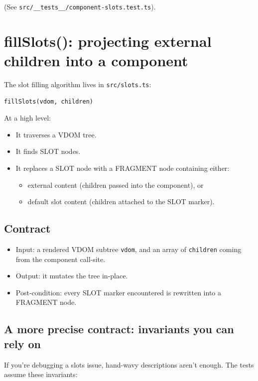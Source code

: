 (See \texttt{src/\_\_tests\_\_/component-slots.test.ts}).

\section{fillSlots(): projecting external children into a component}

The slot filling algorithm lives in \texttt{src/slots.ts}:

\begin{verbatim}
fillSlots(vdom, children)
\end{verbatim}

At a high level:

\begin{itemize}
  \item It traverses a VDOM tree.
  \item It finds SLOT nodes.
  \item It replaces a SLOT node with a FRAGMENT node containing either:
    \begin{itemize}
      \item external content (children passed into the component), or
      \item default slot content (children attached to the SLOT marker).
    \end{itemize}
\end{itemize}

\subsection{Contract}

\begin{itemize}
  \item Input: a rendered VDOM subtree \texttt{vdom}, and an array of \texttt{children} coming from the component call-site.
  \item Output: it mutates the tree in-place.
  \item Post-condition: every SLOT marker encountered is rewritten into a FRAGMENT node.
\end{itemize}

\subsection{A more precise contract: invariants you can rely on}

If you're debugging a slots issue, hand-wavy descriptions aren't enough. The tests assume these invariants:

